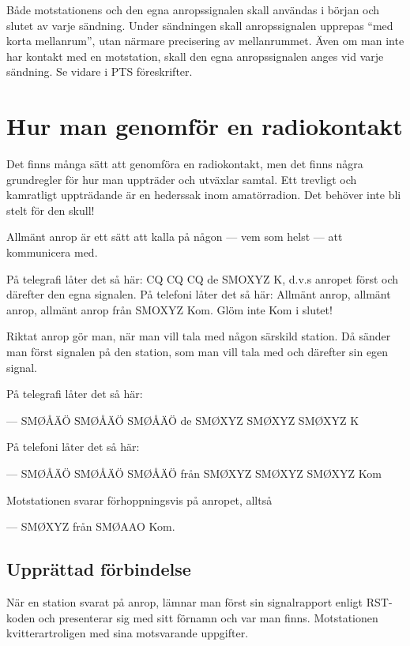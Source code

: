 Både motstationens och den egna anropssignalen skall användas i början
och slutet av varje sändning.  Under sändningen skall anropssignalen
upprepas ``med korta mellanrum'', utan närmare precisering av
mellanrummet.  Även om man inte har kontakt med en motstation, skall
den egna anropssignalen anges vid varje sändning.  Se vidare i PTS
föreskrifter.


\section{Hur man genomför en radiokontakt}

Det finns många sätt att genomföra en radiokontakt, men det finns
några grundregler för hur man uppträder och utväxlar samtal. Ett
trevligt och kamratligt uppträdande är en hederssak inom
amatörradion. Det behöver inte bli stelt för den skull!

Allmänt anrop är ett sätt att kalla på någon
--- vem som helst --- att kommunicera med.

På telegrafi låter det så här: CQ CQ CQ de SMOXYZ K, d.v.s anropet
först och därefter den egna signalen.  På telefoni låter det så här:
Allmänt anrop, allmänt anrop, allmänt anrop från SMOXYZ Kom. Glöm inte
Kom i slutet!

Riktat anrop gör man, när man vill tala med någon särskild station. Då
sänder man först signalen på den station, som man vill tala med och
därefter sin egen signal.

På telegrafi låter det så här:

--- SMØÅÄÖ SMØÅÄÖ SMØÅÄÖ de SMØXYZ SMØXYZ SMØXYZ K

På telefoni låter det så här:

--- SMØÅÄÖ SMØÅÄÖ SMØÅÄÖ från SMØXYZ SMØXYZ SMØXYZ Kom

Motstationen svarar förhoppningsvis på anropet, alltså

--- SMØXYZ från SMØAAO Kom.

\subsection{Upprättad förbindelse}

När en station svarat på anrop, lämnar man först sin signalrapport
enligt RST-koden och presenterar sig med sitt förnamn och var man
finns. Motstationen kvitterartroligen med sina motsvarande
uppgifter.

